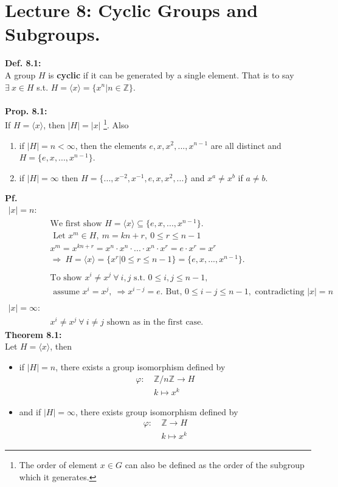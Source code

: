 \documentclass{article}
\begin{document}
\section{Lecture 8: Cyclic Groups and Subgroups.}
\textbf{Def. 8.1:}\\
A group $H$ is \textbf{cyclic} if it can be generated by a single element. That is to say $\exists~ x\in H$ s.t. $H=\langle x\rangle=\lbrace x^n|n\in \mathbb{Z}\rbrace$.\\
\vspace{2mm}~\\
\textbf{Prop. 8.1:}\\
If  $H=\langle x\rangle$, then $|H|=|x|$  \footnote{The order of element $x\in G$ can also be defined as the order of the subgroup which it generates.}. Also
\begin{enumerate}
\item if $|H|=n<\infty$, then the elements $e,x,x^2,...,x^{n-1}$ are all distinct and $H=\lbrace e,x,...,x^{n-1}\rbrace$.
\item if $|H|=\infty$ then $H=\lbrace ...,x^{-2},x^{-1},e,x,x^2,...\rbrace$ and $x^a\neq x^b$ if $a\neq b$. 
\end{enumerate}
\textbf{Pf.}\\
\begin{align*}
|x|=n:~&\\
& \text{We first show }H=\langle x \rangle\subseteq\lbrace e,x,...,x^{n-1}\rbrace.\\
&\text{ Let } x^m\in H,~m=kn+r, ~0\leq r\leq n-1\\
&x^m=x^{kn+r}=x^n\cdot x^n \cdot ... \cdot x^n \cdot x^r = e\cdot x^r=x^r\\
&\Rightarrow ~ H=\langle x\rangle=\lbrace x^r|0\leq r\leq n-1\rbrace=\lbrace e,x,...,x^{n-1}\rbrace.\\
&~\\
&\text{To show } x^i\neq x^j~\forall~i,j\text{ s.t. }0\leq i,j\leq n-1,\\
&\text{ assume } x^i=x^j,~\Rightarrow x^{i-j}=e. \text{ But, }0\leq i-j\leq n-1,\text{ contradicting } |x|=n\\
&~\\
|x|=\infty:~&\\
&x^i\neq x^j~\forall~ i\neq j\text{ shown as in the first case.}
\end{align*}
\textbf{Theorem 8.1:}\\
Let $H=\langle x\rangle$, then
\begin{itemize}
\item if $|H|=n$, there exists a group isomorphism defined by
\begin{align}
\varphi:~ &\mathbb{Z}/n\mathbb{Z}\rightarrow H\\
			  &k\mapsto x^k
\end{align}
\item and if $|H|=\infty$, there exists group isomorphism defined by
\begin{align*}
\varphi:~&\mathbb{Z}\rightarrow H\\
&k\mapsto x^k
\end{align*}
\end{itemize}
\end{document}
